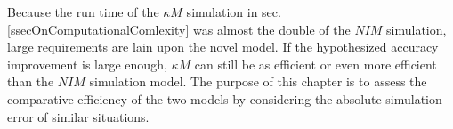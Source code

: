 \documentclass[b5paper,12 pt]{report}
\begin{document}
		Because the run time of the $\kappa M$ simulation in sec. \ref{ssecOnComputationalComlexity} was almost the double of the $NIM$ simulation, large requirements are lain upon the novel model.
		If the hypothesized accuracy improvement is large enough, $\kappa M$ can still be as efficient or even more efficient than the $NIM$ simulation model.
		The purpose of this chapter is to assess the comparative efficiency of the two models by considering the absolute simulation error of similar situations.







% 
\end{document}

